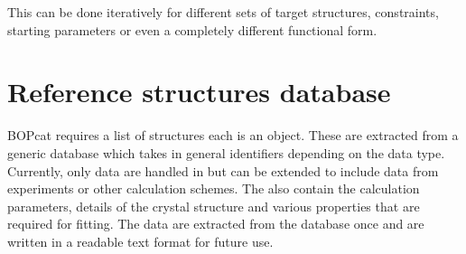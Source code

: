\documentclass[letterpaper,10pt,english]{sphinxmanual}
\begin{document}
This can be done iteratively for different sets of target structures, constraints, starting parameters or even a completely different functional form.


\chapter{Reference structures database}
\label{refdata:refdata}\label{refdata::doc}\label{refdata:reference-structures-database}
BOPcat requires a list of structures each is an  object.
These are extracted from a generic database which takes in general identifiers
depending on the data type. Currently, only  data are handled in
but can be extended to include data from experiments or
other calculation schemes. The  also contain the calculation
parameters, details of the crystal structure and various properties that are
required for fitting. The data are extracted from the database once and are written in
a readable text format for future use.
\end{document}
